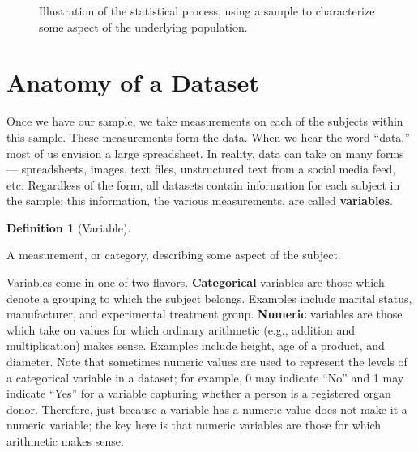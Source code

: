 \documentclass[
  letterpaper,
  DIV=11,
  numbers=noendperiod]{scrreprt}
\theoremstyle{definition}
\newtheorem{definition}{Definition}[chapter]
\theoremstyle{definition}
\theoremstyle{plain}
\theoremstyle{remark}
\begin{document}
\begin{figure}


\caption{\label{fig-basics-statistical-process}Illustration of the
statistical process, using a sample to characterize some aspect of the
underlying population.}

\end{figure}%

\section{Anatomy of a Dataset}\label{anatomy-of-a-dataset}

Once we have our sample, we take measurements on each of the subjects
within this sample. These measurements form the data. When we hear the
word ``data,'' most of us envision a large spreadsheet. In reality, data
can take on many forms --- spreadsheets, images, text files,
unstructured text from a social media feed, etc. Regardless of the form,
all datasets contain information for each subject in the sample; this
information, the various measurements, are called \textbf{variables}.

\begin{definition}[Variable]\protect\hypertarget{def-variable}{}\label{def-variable}

A measurement, or category, describing some aspect of the subject.

\end{definition}

Variables come in one of two flavors. \textbf{Categorical} variables are
those which denote a grouping to which the subject belongs. Examples
include marital status, manufacturer, and experimental treatment group.
\textbf{Numeric} variables are those which take on values for which
ordinary arithmetic (e.g., addition and multiplication) makes sense.
Examples include height, age of a product, and diameter. Note that
sometimes numeric values are used to represent the levels of a
categorical variable in a dataset; for example, 0 may indicate ``No''
and 1 may indicate ``Yes'' for a variable capturing whether a person is
a registered organ donor. Therefore, just because a variable has a
numeric value does not make it a numeric variable; the key here is that
numeric variables are those for which arithmetic makes sense.
\end{document}
